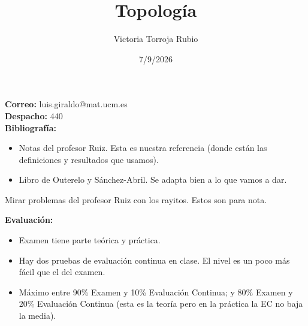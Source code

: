 \documentclass{report}
\begin{document}
\title{Topología}
\author{Victoria Torroja Rubio}
\date{7/9/2026}

\maketitle

\tableofcontents

\pagebreak

\textbf{Correo:} luis.giraldo@mat.ucm.es \\
\textbf{Despacho:} 440 \\
\textbf{Bibliografía:} 
\begin{itemize}
\item Notas del profesor Ruiz. Esta es nuestra referencia (donde están las definiciones y resultados que usamos).
\item Libro de Outerelo y Sánchez-Abril. Se adapta bien a lo que vamos a dar.
\end{itemize}
\begin{observation}
Mirar problemas del profesor Ruiz con los rayitos. Estos son para nota.
\end{observation}
\textbf{Evaluación:} 
\begin{itemize}
\item Examen tiene parte teórica y práctica.
\item Hay dos pruebas de evaluación continua en clase. El nivel es un poco más fácil que el del examen.
\item Máximo entre 90\% Examen y 10\% Evaluación Continua; y 80\% Examen y 20\% Evaluación Continua (esta es la teoría pero en la práctica la EC no baja la media).
\end{itemize}








\end{document}
